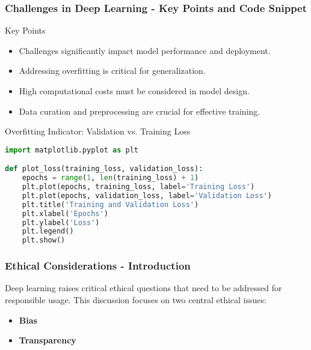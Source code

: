 \documentclass[aspectratio=169]{beamer}
\begin{document}
\begin{frame}[fragile]
    \frametitle{Challenges in Deep Learning - Key Points and Code Snippet}
    \begin{block}{Key Points}
        \begin{itemize}
            \item Challenges significantly impact model performance and deployment.
            \item Addressing overfitting is critical for generalization.
            \item High computational costs must be considered in model design.
            \item Data curation and preprocessing are crucial for effective training.
        \end{itemize}
    \end{block}
    
    \begin{block}{Overfitting Indicator: Validation vs. Training Loss}
        \begin{lstlisting}[language=Python]
import matplotlib.pyplot as plt

def plot_loss(training_loss, validation_loss):
    epochs = range(1, len(training_loss) + 1)
    plt.plot(epochs, training_loss, label='Training Loss')
    plt.plot(epochs, validation_loss, label='Validation Loss')
    plt.title('Training and Validation Loss')
    plt.xlabel('Epochs')
    plt.ylabel('Loss')
    plt.legend()
    plt.show()
        \end{lstlisting}
    \end{block}
\end{frame}

\begin{frame}[fragile]
    \frametitle{Ethical Considerations - Introduction}
    Deep learning raises critical ethical questions that need to be addressed for responsible usage. 
    This discussion focuses on two central ethical issues:
    \begin{itemize}
        \item \textbf{Bias}
        \item \textbf{Transparency}
    \end{itemize}
\end{frame}
\end{document}
